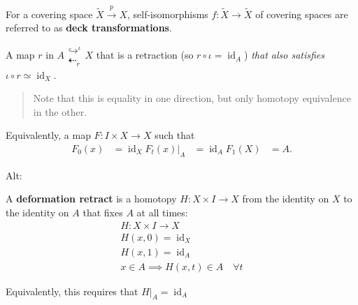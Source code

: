 \begin{definition}[Cycle]

\end{definition}


\begin{definition}

For a covering space \(\tilde X \xrightarrow{p} X\), self-isomorphisms
\(f:\tilde X \to \tilde X\) of covering spaces are referred to as
\textbf{deck transformations}.

\end{definition}

\begin{definition}[Deformation]

\end{definition}


\begin{definition}

A map \(r\) in
\(A\mathrel{\textstyle\substack{\hookrightarrow^{\iota}\\\textstyle\dashleftarrow_{r}}} X\)
that is a retraction (so \(r\circ \iota = \operatorname{id}_{A}\))
\emph{that also satisfies}
\(\iota \circ r \simeq\operatorname{id}_{X}\).

\begin{quote}
Note that this is equality in one direction, but only homotopy
equivalence in the other.
\end{quote}

Equivalently, a map \(F:I\times X\to X\) such that
\begin{align*}
F_{0}(x) &= \operatorname{id}_{X}
F_{t}(x)\mathrel{\Big|}_{A} &= \operatorname{id}_{A}
F_{1}(X) &= A
.\end{align*}

Alt:

A \textbf{deformation retract} is a homotopy \(H:X\times I \to X\) from
the identity on \(X\) to the identity on \(A\) that fixes \(A\) at all
times:
\begin{align*}
H: X\times I \to X \\
H(x, 0) = \operatorname{id}_X \\
H(x, 1) = \operatorname{id}_A \\
x\in A \implies H(x, t) \in A \quad \forall t
\end{align*}

Equivalently, this requires that
\({\left.{{H}} \right|_{{A}} } = \operatorname{id}_A\)

\end{definition}


